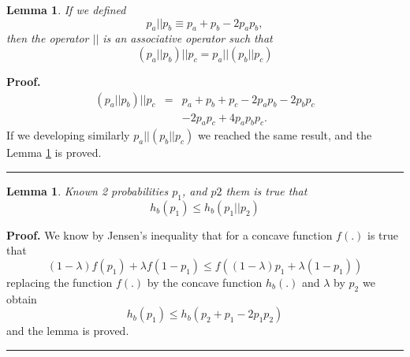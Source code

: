 \documentclass[a4paper,10pt]{article}
\newtheorem{mylemma}[mytheorem]{Lemma}
\newenvironment{myproof}[1][Proof]{\textbf{#1.} }{\ \rule{0.5em}{0.5em}}
\begin{document}
\begin{mdframed}[style=MDFStyGrayScreen]
\begin{mylemma}
\label{lemma:def} 
If we defined 
\begin{equation} \label{eq:ab2}
 p_a || p_b \equiv p_a + p_b -2 p_a p_b, 
\end{equation} 
then the operator $||$ is an associative operator such that
\begin{equation} \label{eq:def1}
 (p_a || p_b)||p_c = p_a || (p_b||p_c)
\end{equation} 
\end{mylemma}
\end{mdframed}
\begin{myproof}
\label{proof:def}
\begin{equation} \label{eq:def2}
\begin{matrix}
(p_a || p_b)||p_c & = & p_a + p_b + p_c -2 p_a p_b -2 p_b p_c  \\
~                 & ~ & -2 p_a p_c + 4 p_a p_b p_c.
\end{matrix}
\end{equation} 
If we developing similarly $p_a || (p_b||p_c)$ we reached the same result, and 
the Lemma \ref{lemma:def} is proved.
\end{myproof}
\begin{mdframed}[style=MDFStyGrayScreen]
\begin{mylemma}
\label{lemma:psimple} 
Known 2 probabilities $p_1$, and $p2$
them is true that
\begin{equation} \label{eq:psimple1}
h_b(p_1) \leq h_b(p_1||p_2) 
\end{equation}
\end{mylemma}
\end{mdframed}
\begin{myproof}
\label{proof:psimple} 
We know  by Jensen's inequality \cite{cover} that for a concave function $f(.)$ 
is true that
\begin{equation} \label{eq:psimple2}
(1-\lambda) f(p_1) +\lambda f(1-p_1)  \leq f((1-\lambda) p_1 +\lambda (1-p_1))
\end{equation}
replacing the function $f(.)$ by the concave function $h_b(.)$ and $\lambda$ 
by $p_2$ we obtain
\begin{equation} \label{eq:psimple3}
h_b(p_1)  \leq h_b(p_2 + p_1 - 2 p_1 p_2)
\end{equation}
and the lemma is proved.
\end{myproof}
\end{document}
